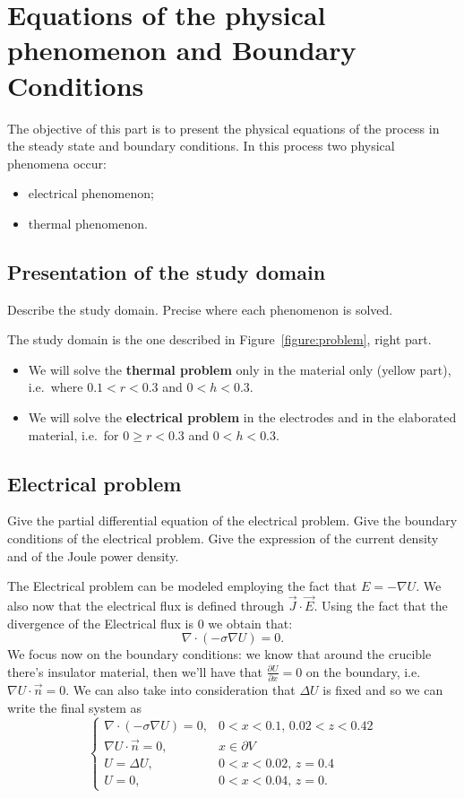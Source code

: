 \documentclass{article}
\newcommand{\pd}[2]{\frac{\partial #1}{\partial #2}}
\begin{document}
\section{Equations of the physical phenomenon and Boundary Conditions}
The objective of this part is to present the physical equations of the process in the steady state and boundary conditions. In this process two physical phenomena occur:
\begin{itemize}
	\item electrical phenomenon;
	\item thermal phenomenon.
\end{itemize}
\subsection{Presentation of the study domain}
Describe the study domain. Precise where each phenomenon is solved.
\begin{mdframed}
	The study domain is the one described in Figure~\ref{figure:problem}, right part. 
	\begin{itemize}
		\item We will solve the \textbf{thermal problem} only in the material only (yellow part), i.e.~where $ 0.1<r<0.3 $ and $ 0<h<0.3 $.
		\item We will solve the \textbf{electrical problem} in the electrodes and in the elaborated material, i.e.~for $ 0\geq r<0.3 $ and $ 0<h<0.3 $.  
	\end{itemize} 
\end{mdframed}
\subsection{Electrical problem}
Give the partial differential equation of the electrical problem.
Give the boundary conditions of the electrical problem.
Give the expression of the current density and of the Joule power density.
\begin{mdframed}
	The Electrical problem can be modeled employing the fact that $ E=-\nabla U $. We also now that the electrical flux is defined through $ \vec{J}\cdot \vec{E} $. Using the fact that the divergence of the Electrical flux is 0 we obtain that:
	\[ \nabla\cdot(-\sigma\nabla U)=0. \]
	We focus now on the boundary conditions: we know that around the crucible there's insulator material, then we'll have that $ \pd{U}{x}=0 $ on the boundary, i.e. $ \nabla U\cdot \vec{n}=0 $. We can also take into consideration that $ \Delta U $ is fixed and so we can write the final system as
	\[
	\begin{cases}
	\nabla\cdot(-\sigma\nabla U)=0, & 0<x<0.1,\,0.02<z<0.42\\
	\nabla U\cdot \vec{n}=0,& x\in \partial V\\
	U = \Delta U, & 0<x<0.02,\,z=0.4\\
	U=0, & 0<x<0.04,\,z=0.
	\end{cases}
	\]
\end{mdframed}
\end{document}
